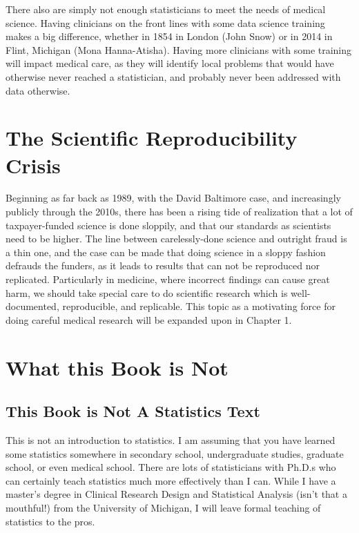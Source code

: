 \documentclass[
]{book}
\begin{document}
There also are simply not enough statisticians to meet the needs of medical science. Having clinicians on the front lines with some data science training makes a big difference, whether in 1854 in London (John Snow) or in 2014 in Flint, Michigan (Mona Hanna-Atisha). Having more clinicians with some training will impact medical care, as they will identify local problems that would have otherwise never reached a statistician, and probably never been addressed with data otherwise.

\hypertarget{the-scientific-reproducibility-crisis}{%
\section{The Scientific Reproducibility Crisis}\label{the-scientific-reproducibility-crisis}}

Beginning as far back as 1989, with the David Baltimore case, and increasingly publicly through the 2010s, there has been a rising tide of realization that a lot of taxpayer-funded science is done sloppily, and that our standards as scientists need to be higher. The line between carelessly-done science and outright fraud is a thin one, and the case can be made that doing science in a sloppy fashion defrauds the funders, as it leads to results that can not be reproduced nor replicated. Particularly in medicine, where incorrect findings can cause great harm, we should take special care to do scientific research which is well-documented, reproducible, and replicable. This topic as a motivating force for doing careful medical research will be expanded upon in Chapter 1.

\hypertarget{what-this-book-is-not}{%
\section{What this Book is Not}\label{what-this-book-is-not}}

\hypertarget{this-book-is-not-a-statistics-text}{%
\subsection{This Book is Not A Statistics Text}\label{this-book-is-not-a-statistics-text}}

This is not an introduction to statistics. I am assuming that you have learned some statistics somewhere in secondary school, undergraduate studies, graduate school, or even medical school. There are lots of statisticians with Ph.D.s who can certainly teach statistics much more effectively than I can. While I have a master's degree in Clinical Research Design and Statistical Analysis (isn't that a mouthful!) from the University of Michigan, I will leave formal teaching of statistics to the pros.
\end{document}
